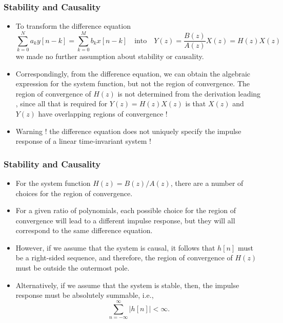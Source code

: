 \begin{frame}
\frametitle{Stability and Causality}
\begin{itemize}
\item To transform the difference equation
$$
 \sum_{k=0}^{N}a_{k}y[n-k]=\sum_{k=0}^{M}b_{k}x[n-k] \quad \text{into} \quad Y(z)= \frac{B(z)}{A(z)} X(z) = H(z) X(z)
$$
we made no further assumption about stability or causality. 
\item Correspondingly, from the difference equation, we can obtain the algebraic expression for the system function, but not the region of convergence. The region of convergence of $H(z)$ is \alert{not determined} from the derivation leading , since all that is required for $Y(z)= H(z) X(z)$ is that $X(z)$ and $Y(z)$ have overlapping regions of convergence ! 
\item \alert{Warning !}  \alert{the difference equation does not uniquely specify the impulse response of a linear time-invariant system} !
\end{itemize}     
\end{frame}


\begin{frame}
\frametitle{Stability and Causality}
\begin{itemize}
\item For the system function $H(z)= B(z)/A(z)$, there are a number of choices for the region of convergence. 
\item For a given ratio of polynomials, \alert{each possible choice for the region of convergence will lead to a different impulse response}, but they will all \alert{correspond to the same difference equation}. 
\item However, \alert{if we assume that the system is causal}, it follows that $h[n]$ must be a right-sided sequence, and therefore, the region of convergence of $H(z)$ must be outside the outermost pole. 
\item Alternatively, if we assume that \alert{the system is stable}, then,  the impulse response must be absolutely summable, i.e., 
$$
\sum_{n=-\infty}^{\infty}|h[n]|<\infty.
$$
\end{itemize}
\end{frame}

